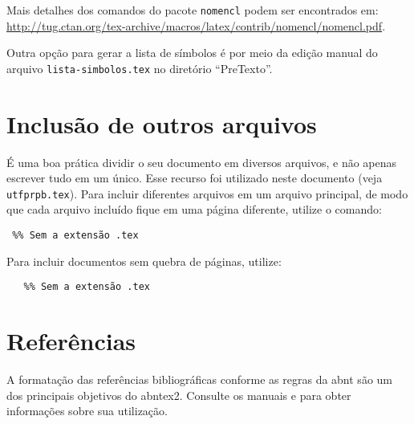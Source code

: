 Mais detalhes dos comandos do pacote \texttt{nomencl} podem ser encontrados em: \url{http://tug.ctan.org/tex-archive/macros/latex/contrib/nomencl/nomencl.pdf}.

Outra opção para gerar a lista de símbolos é por meio da edição manual do arquivo \texttt{lista-simbolos.tex} no diretório ``PreTexto''.

\section{Inclusão de outros arquivos}\label{sec:inclusao}

É uma boa prática dividir o seu documento em diversos arquivos, e não apenas escrever tudo em um único. Esse recurso foi utilizado neste documento (veja \texttt{utfprpb.tex}). Para incluir diferentes arquivos em um arquivo principal, de modo que cada arquivo incluído fique em uma página diferente, utilize o comando:

\begin{SingleSpacing}%
    \begin{verbatim}
 %% Sem a extensão .tex
\end{verbatim}
\end{SingleSpacing}

Para incluir documentos sem quebra de páginas, utilize:

\begin{SingleSpacing}%
    \begin{verbatim}
   %% Sem a extensão .tex
\end{verbatim}
\end{SingleSpacing}

\section{Referências}\label{sec:referencias}

A formatação das referências bibliográficas conforme as regras da \gls{abnt} são um dos principais objetivos do \gls{abntex2}. Consulte os manuais  e  para obter informações sobre sua utilização.


